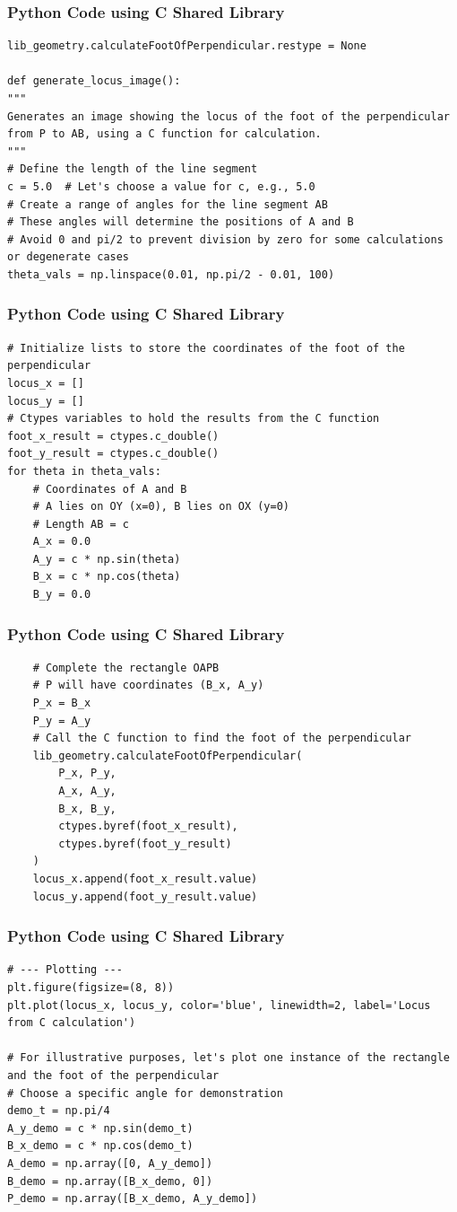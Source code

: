\documentclass{beamer}
\begin{document}
\begin{frame}[fragile]
\frametitle{Python Code using C Shared Library}
\begin{lstlisting}
lib_geometry.calculateFootOfPerpendicular.restype = None

def generate_locus_image():
"""
Generates an image showing the locus of the foot of the perpendicular
from P to AB, using a C function for calculation.
"""
# Define the length of the line segment
c = 5.0  # Let's choose a value for c, e.g., 5.0
# Create a range of angles for the line segment AB
# These angles will determine the positions of A and B
# Avoid 0 and pi/2 to prevent division by zero for some calculations or degenerate cases
theta_vals = np.linspace(0.01, np.pi/2 - 0.01, 100)
\end{lstlisting}
\end{frame}

\begin{frame}[fragile]
\frametitle{Python Code using C Shared Library}
\begin{lstlisting}
# Initialize lists to store the coordinates of the foot of the perpendicular
locus_x = []
locus_y = []
# Ctypes variables to hold the results from the C function
foot_x_result = ctypes.c_double()
foot_y_result = ctypes.c_double()
for theta in theta_vals:
    # Coordinates of A and B
    # A lies on OY (x=0), B lies on OX (y=0)
    # Length AB = c
    A_x = 0.0
    A_y = c * np.sin(theta)
    B_x = c * np.cos(theta)
    B_y = 0.0
\end{lstlisting}
\end{frame}

\begin{frame}[fragile]
\frametitle{Python Code using C Shared Library}
\begin{lstlisting}
    # Complete the rectangle OAPB
    # P will have coordinates (B_x, A_y)
    P_x = B_x
    P_y = A_y
    # Call the C function to find the foot of the perpendicular
    lib_geometry.calculateFootOfPerpendicular(
        P_x, P_y,
        A_x, A_y,
        B_x, B_y,
        ctypes.byref(foot_x_result),
        ctypes.byref(foot_y_result)
    )
    locus_x.append(foot_x_result.value)
    locus_y.append(foot_y_result.value)
\end{lstlisting}
\end{frame}

\begin{frame}[fragile]
\frametitle{Python Code using C Shared Library}
\begin{lstlisting}
# --- Plotting ---
plt.figure(figsize=(8, 8))
plt.plot(locus_x, locus_y, color='blue', linewidth=2, label='Locus from C calculation')

# For illustrative purposes, let's plot one instance of the rectangle and the foot of the perpendicular
# Choose a specific angle for demonstration
demo_t = np.pi/4
A_y_demo = c * np.sin(demo_t)
B_x_demo = c * np.cos(demo_t)
A_demo = np.array([0, A_y_demo])
B_demo = np.array([B_x_demo, 0])
P_demo = np.array([B_x_demo, A_y_demo])
\end{lstlisting}
\end{frame}
\end{document}
